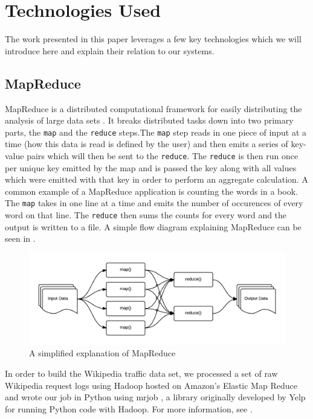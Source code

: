 \section{Technologies Used}
The work presented in this paper leverages a few key technologies which we will introduce here and explain their relation to our systems.

\subsection{MapReduce}
MapReduce is a distributed computational framework for easily distributing the analysis of large data sets \cite{dean2008mapreduce}. It breaks distributed tasks down into two primary parts, the \texttt{map} and the \texttt{reduce} steps.The \texttt{map} step reads in one piece of input at a time (how this data is read is defined by the user) and then emits a series of key-value pairs which will then be sent to the \texttt{reduce}. The \texttt{reduce} is then run once per unique key emitted by the map and is passed the key along with all values which were emitted with that key in order to perform an aggregate calculation. A common example of a MapReduce application is counting the words in a book. The \texttt{map} takes in one line at a time and emits the number of occurences of every word on that line. The \texttt{reduce} then sums the counts for every word and the output is written to a file. A simple flow diagram explaining MapReduce can be seen in .

\begin{figure}
\centering
\includegraphics[width=\textwidth]{diagrams/mapreduce.png}
\caption{A simplified explanation of MapReduce}
\label{fig:mapreduce}
\end{figure}

In order to build the Wikipedia traffic data set, we processed a set of raw Wikipedia request logs using Hadoop \cite{hadoop} hosted on Amazon's Elastic Map Reduce \cite{emr} and wrote our job in Python using mrjob \cite{mrjob}, a library originally developed by Yelp for running Python code with Hadoop. For more information, see .

